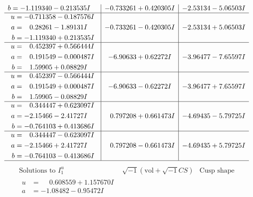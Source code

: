 \documentclass[1p]{elsarticle_modified}
\theoremstyle{definition}
\newcommand{\I}{\sqrt{-1}}
\begin{document}
$$\begin{array}{c|c|c}
\begin{aligned}
b &= -1.119340 - 0.213535 I\end{aligned}
 & -0.733261 + 0.420305 I & -2.53134 - 5.06503 I \\ \hline\begin{aligned}
u &= -0.711358 - 0.187576 I \\
a &= \phantom{-}0.28261 - 1.89131 I \\
b &= -1.119340 + 0.213535 I\end{aligned}
 & -0.733261 - 0.420305 I & -2.53134 + 5.06503 I \\ \hline\begin{aligned}
u &= \phantom{-}0.452397 + 0.566444 I \\
a &= \phantom{-}0.191549 - 0.000487 I \\
b &= \phantom{-}1.59905 + 0.08829 I\end{aligned}
 & -6.90633 + 0.62272 I & -3.96477 - 7.65597 I \\ \hline\begin{aligned}
u &= \phantom{-}0.452397 - 0.566444 I \\
a &= \phantom{-}0.191549 + 0.000487 I \\
b &= \phantom{-}1.59905 - 0.08829 I\end{aligned}
 & -6.90633 - 0.62272 I & -3.96477 + 7.65597 I \\ \hline\begin{aligned}
u &= \phantom{-}0.344447 + 0.623097 I \\
a &= -2.15466 - 2.41727 I \\
b &= -0.764103 + 0.413686 I\end{aligned}
 & \phantom{-}0.797208 + 0.661473 I & -4.69435 - 5.79725 I \\ \hline\begin{aligned}
u &= \phantom{-}0.344447 - 0.623097 I \\
a &= -2.15466 + 2.41727 I \\
b &= -0.764103 - 0.413686 I\end{aligned}
 & \phantom{-}0.797208 - 0.661473 I & -4.69435 + 5.79725 I\\
 \hline 
 \end{array}$$\newpage$$\begin{array}{c|c|c}  
\text{Solutions to }I^u_{1}& \I (\text{vol} + \sqrt{-1}CS) & \text{Cusp shape}\\
 \hline 
\begin{aligned}
u &= \phantom{-}0.608559 + 1.157670 I \\
a &= -1.08482 - 0.95472 I \\

\end{aligned}
\end{array}$$
\end{document}
